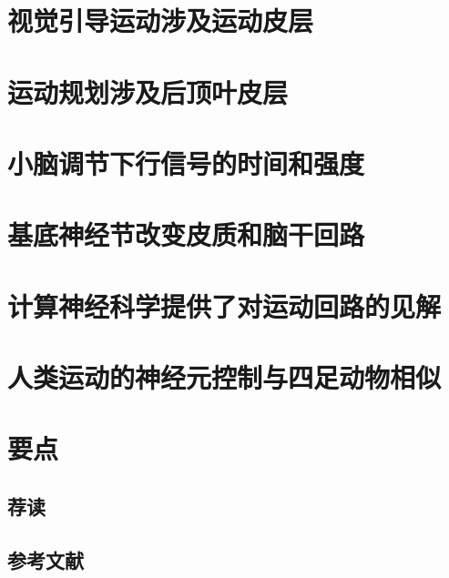 \section{视觉引导运动涉及运动皮层}

\section{运动规划涉及后顶叶皮层}

\section{小脑调节下行信号的时间和强度}

\section{基底神经节改变皮质和脑干回路}

\section{计算神经科学提供了对运动回路的见解}

\section{人类运动的神经元控制与四足动物相似}

\section{要点}
\subsection{荐读}
\subsection{参考文献}